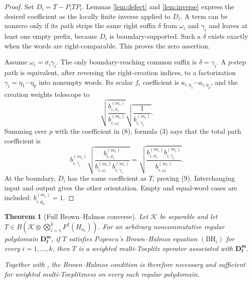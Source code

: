 \documentclass[11pt]{article}
\newtheorem{theorem}{Theorem}
\newcommand{\cK}{\mathcal K}
\begin{document}
\begin{proof}
Set $D_i=T-P_iTP_i$.  Lemmas \ref{lem:defect} and \ref{lem:inverse} express the desired coefficient as the locally finite inverse applied to $D_i$.  A term can be nonzero only if its path strips the same right suffix $\delta$ from $\omega_i$ and $\gamma_i$ and leaves at least one empty prefix, because $D_i$ is boundary-supported.  Such a $\delta$ exists exactly when the words are right-comparable.  This proves the zero assertion.

Assume $\omega_i=\sigma_i\gamma_i$.  The only boundary-reaching common suffix is $\delta=\gamma_i$.  A $p$-step path is equivalent, after reversing the right-creation indices, to a factorization
$\gamma_i=\eta_1\cdots\eta_p$ into nonempty words.  Its scalar $f_i$ coefficient is
$a_{i,\eta_1}\cdots a_{i,\eta_p}$, and the creation weights telescope to
\[
 \sqrt{\frac{b_{i,\sigma_i}^{(m_i)}}{b_{i,\omega_i}^{(m_i)}}}
 \sqrt{\frac{1}{b_{i,\gamma_i}^{(m_i)}}}.
\]
Summing over $p$ with the coefficient in (8), formula (3) says that the total path coefficient is
\[
 b_{i,\gamma_i}^{(m_i)}
 \sqrt{\frac{b_{i,\sigma_i}^{(m_i)}}
              {b_{i,\omega_i}^{(m_i)}b_{i,\gamma_i}^{(m_i)}}}
 =\sqrt{\frac{b_{i,\sigma_i}^{(m_i)}b_{i,\gamma_i}^{(m_i)}}
              {b_{i,\omega_i}^{(m_i)}}}.
\]
At the boundary, $D_i$ has the same coefficient as $T$, proving (9).  Interchanging input and output gives the other orientation.  Empty and equal-word cases are included: $b_{i,g_0}^{(m_i)}=1$.
\end{proof}

\begin{theorem}[Full Brown--Halmos converse]\label{thm:main}
Let $\cK$ be separable and let $T\in B(\cK\otimes\bigotimes_{i=1}^kF^2(H_{n_i}))$.  For an arbitrary noncommutative regular polydomain $\mathbf D_{\mathbf f}^{\mathbf m}$, if $T$ satisfies Popescu's Brown--Halmos equation $(\mathrm{BH}_i)$ for every $i=1,\dots,k$, then $T$ is a weighted multi-Toeplitz operator associated with $\mathbf D_{\mathbf f}^{\mathbf m}$.

Together with \cite[Theorem 4.3]{Popescu}, the Brown--Halmos condition is therefore necessary and sufficient for weighted multi-Toeplitzness on every such regular polydomain.
\end{theorem}
\end{document}
